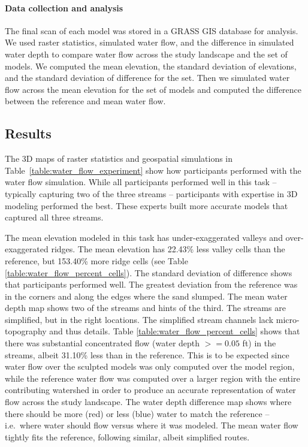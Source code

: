 \documentclass[Afour,sagev,times]{sagej} %
\begin{document}
\paragraph{Data collection and analysis}
The final scan of each model was stored 
in a GRASS GIS database for analysis. 
We used raster statistics, simulated water flow, 
and the difference in simulated water depth 
to compare water flow across the study landscape 
and the set of models.
We computed the mean elevation,
the standard deviation of elevations, 
and the standard deviation of difference for the set.
Then we simulated water flow across 
the mean elevation for the set of models
and computed the difference 
between the reference and mean water flow. 

\subsection{Results}
The 3D maps of raster statistics and geospatial simulations in
Table~\ref{table:water_flow_experiment} 
show how participants performed with the water flow simulation.
While all participants performed well in this task
-- typically capturing two of the three streams -- 
participants with expertise in 3D modeling performed the best.
These experts built more accurate models
that captured all three streams.

The mean elevation modeled in this task
has under-exaggerated valleys and 
over-exaggerated ridges. 
The mean elevation has 22.43\% less valley cells 
than the reference, 
but 153.40\% more ridge cells
(see Table \ref{table:water_flow_percent_cells}). 
The standard deviation of difference 
shows that participants performed well. 
The greatest deviation from the reference
was in the corners and along the edges
where the sand slumped.
The mean water depth map shows two of the streams 
and hints of the third.
The streams are simplified, but in the right locations. 
The simplified stream channels lack micro-topography
and thus details. 
Table \ref{table:water_flow_percent_cells} shows that 
there was substantial concentrated flow (water depth $>=0.05$ ft) 
in the streams, albeit 31.10\% less than in the reference.
This is to be expected since 
water flow over the sculpted models 
was only computed over the model region, while 
the reference water flow 
was computed over a larger region 
with the entire contributing watershed 
in order to produce an accurate representation 
of water flow across the study landscape. 
The water depth difference map shows
where there should be more (red) or less (blue) water
to match the reference
-- i.e.~where water should flow versus where it was modeled. 
The mean water flow tightly fits the reference, 
following similar, albeit simplified routes.
\end{document}
